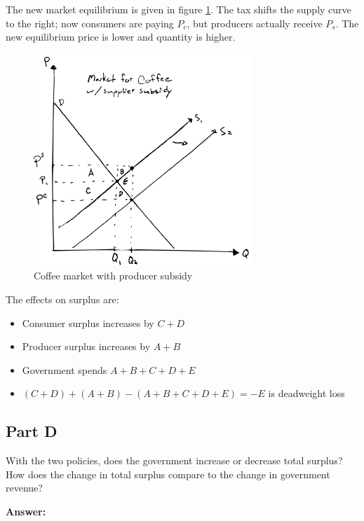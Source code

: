 \documentclass[12pt]{article}
\begin{document}
\vspace{2mm}

The new market equilibrium is given in figure \ref{fig:coffee3}. The tax shifts the supply curve to the right; now consumers are paying $P_c$, but producers actually receive $P_s$. The new equilibrium price is lower and quantity is higher.

\begin{figure}
    \centering
    \includegraphics[width=.5\textwidth]{../../figs/coffee3.png}
    \caption{Coffee market with producer subsidy}
    \label{fig:coffee3}
\end{figure}

The effects on surplus are:
    \begin{itemize}
        \item Consumer surplus increases by $C + D$
        \item Producer surplus increases by $A + B$
        \item Government spends $ A + B + C + D + E $
        \item $(C+D) + (A + B) -  (A + B + C + D + E) = - E$ is deadweight loss
    \end{itemize}

\vspace{2mm}

\subsection*{Part D}
With the two policies, does the government increase or decrease total surplus? How does the change in total surplus compare to the change in government revenue?

\vspace{2mm}

\textbf{Answer:}

\vspace{2mm}
\end{document}
